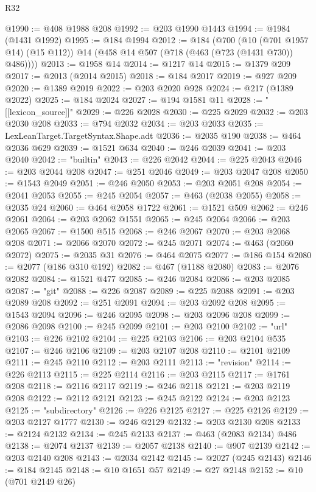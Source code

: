 \begin{lexlean}{R32}
\begin{coremodule}
@1990 := @408 @1988 @208
@1992 := @203 @1990 @1443
@1994 := @1984 (@1431 @1992)
@1995 := @184 @1994
@2012 := @184
    (@700
      (@10 (@701 @1957 @14) (@15 @112))
      @14
      (@458 @14 @507 (@718 (@463 (@723 (@1431 @730)) @486))))
@2013 := @1958 @14
@2014 := @1217 @14
@2015 := @1379 @209
@2017 := @2013 (@2014 @2015)
@2018 := @184 @2017
@2019 := @927 @209
@2020 := @1389 @2019
@2022 := @203 @2020 @928
@2024 := @217 (@1389 @2022)
@2025 := @184 @2024
@2027 := @194 @1581 @11
@2028 := "[[lexicon_source]]"
@2029 := @226 @2028
@2030 := @225 @2029
@2032 := @203 @2030 @208
@2033 := @794 @2032
@2034 := @203 @2033
@2035 := LexLeanTarget.TargetSyntax.Shape.adt
@2036 := @2035 @190
@2038 := @464 @2036 @629
@2039 := @1521 @634
@2040 := @246 @2039
@2041 := @203 @2040
@2042 := "builtin"
@2043 := @226 @2042
@2044 := @225 @2043
@2046 := @203 @2044 @208
@2047 := @251 @2046
@2049 := @203 @2047 @208
@2050 := @1543 @2049
@2051 := @246 @2050
@2053 := @203 @2051 @208
@2054 := @2041 @2053
@2055 := @245 @2054
@2057 := @463 (@2038 @2055)
@2058 := @2035 @24
@2060 := @464 @2058 @1722
@2061 := @1521 @509
@2062 := @246 @2061
@2064 := @203 @2062 @1551
@2065 := @245 @2064
@2066 := @203 @2065
@2067 := @1500 @515
@2068 := @246 @2067
@2070 := @203 @2068 @208
@2071 := @2066 @2070
@2072 := @245 @2071
@2074 := @463 (@2060 @2072)
@2075 := @2035 @31
@2076 := @464 @2075
@2077 := @186 @154
@2080 := @2077 (@186 @310 @192)
@2082 := @467 (@1188 @2080)
@2083 := @2076 @2082
@2084 := @1521 @477
@2085 := @246 @2084
@2086 := @203 @2085
@2087 := "git"
@2088 := @226 @2087
@2089 := @225 @2088
@2091 := @203 @2089 @208
@2092 := @251 @2091
@2094 := @203 @2092 @208
@2095 := @1543 @2094
@2096 := @246 @2095
@2098 := @203 @2096 @208
@2099 := @2086 @2098
@2100 := @245 @2099
@2101 := @203 @2100
@2102 := "url"
@2103 := @226 @2102
@2104 := @225 @2103
@2106 := @203 @2104 @535
@2107 := @246 @2106
@2109 := @203 @2107 @208
@2110 := @2101 @2109
@2111 := @245 @2110
@2112 := @203 @2111
@2113 := "revision"
@2114 := @226 @2113
@2115 := @225 @2114
@2116 := @203 @2115
@2117 := @1761 @208
@2118 := @2116 @2117
@2119 := @246 @2118
@2121 := @203 @2119 @208
@2122 := @2112 @2121
@2123 := @245 @2122
@2124 := @203 @2123
@2125 := "subdirectory"
@2126 := @226 @2125
@2127 := @225 @2126
@2129 := @203 @2127 @1777
@2130 := @246 @2129
@2132 := @203 @2130 @208
@2133 := @2124 @2132
@2134 := @245 @2133
@2137 := @463 (@2083 @2134) @486
@2138 := @2074 @2137
@2139 := @2057 @2138
@2140 := @907 @2139
@2142 := @203 @2140 @208
@2143 := @2034 @2142
@2145 := @2027 (@245 @2143)
@2146 := @184 @2145
@2148 := @10 @1651 @57
@2149 := @27 @2148
@2152 := @10 (@701 @2149 @26)

\end{coremodule}
\end{lexlean}
